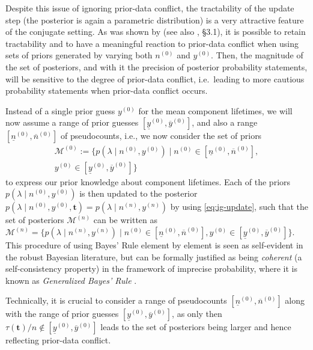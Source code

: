 \documentclass[12pt,a4paper,twocolumn,fleqn]{narms}
\renewcommand{\vec}[1]{{\bm#1}}
\newcommand{\uz}{^{(0)}} %
\newcommand{\un}{^{(n)}} %
\newcommand{\ul}[1]{\underline{#1}}
\newcommand{\ol}[1]{\overline{#1}}
\def\yz{y\uz}
\def\yn{y\un}
\def\yzl{\ul{y}\uz}
\def\yzu{\ol{y}\uz}
\def\nz{n\uz}
\def\nn{n\un}
\def\nzl{\ul{n}\uz}
\def\nzu{\ol{n}\uz}
\def\taut{\tau(\vec{t})}
\def\MZ{\mathcal{M}\uz}
\def\MN{\mathcal{M}\un}
\begin{document}
Despite this issue of ignoring prior-data conflict,
the tractability of the update step
(the posterior is again a parametric distribution)
is a very attractive feature of the conjugate setting.
As was shown by  (see also , \S 3.1),
it is possible to retain tractability and to have a meaningful reaction to prior-data conflict
when using sets of priors generated by varying both $\nz$ and $\yz$.
Then, the magnitude of the set of posteriors,
and with it the precision of posterior probability statements,
will be sensitive to the degree of prior-data conflict,
i.e.\ leading to more cautious probability statements when prior-data conflict occurs.

Instead of a single prior guess $\yz$ for the mean component lifetimes,
we will now assume a range of prior guesses $[\yzl, \yzu]$, and also a range $[\nzl, \nzu]$ of pseudocounts,
i.e., we now consider the set of priors
\begin{multline}
\MZ := \{ p(\lambda\mid\nz,\yz) \mid \nz \in [\nzl, \nzu],\\ \yz \in [\yzl, \yzu] \}
\label{eq:setofpriors}
\end{multline}
to express our prior knowledge about component lifetimes.
Each of the priors $p(\lambda\mid\nz,\yz)$ is then updated to the posterior
$p(\lambda\mid\nz,\yz,\vec{t}) = p(\lambda\mid\nn,\yn)$
by using \eqref{eq:ig-update},
such that the set of posteriors $\MN$ can be written as
$\MN = \{ p(\lambda\mid\nn,\yn) \mid \nz \in [\nzl, \nzu], \yz \in [\yzl, \yzu] \}$.
This procedure of using Bayes' Rule element by element
is seen as self-evident in the robust Bayesian literature,
but can be formally justified as being \emph{coherent}
(a self-consistency property)
in the framework of imprecise probability, where it is known as
\emph{Generalized Bayes' Rule} \cite[\S 6.4]{1991:walley}.

Technically, it is crucial to consider a range of pseudocounts $[\nzl, \nzu]$
along with the range of prior guesses $[\yzl, \yzu]$,
as only then $\taut/n \not\in [\yzl, \yzu]$
leads to the set of posteriors being larger
and hence reflecting prior-data conflict.
\end{document}
